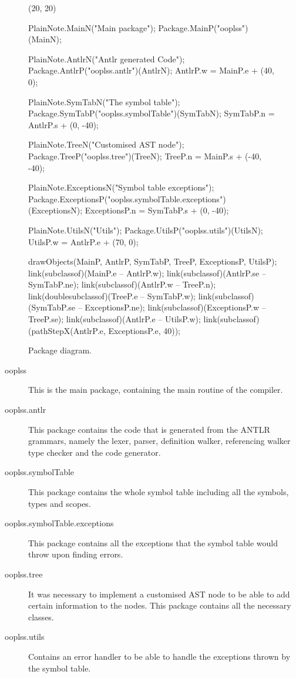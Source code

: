 \begin{figure}[H]
	\centering
	\begin{emp}[classdiag](20, 20)

	PlainNote.MainN("Main package");
	Package.MainP("ooplss")(MainN);

	PlainNote.AntlrN("Antlr generated Code");
	Package.AntlrP("ooplss.antlr")(AntlrN);
	AntlrP.w = MainP.e + (40, 0);

	PlainNote.SymTabN("The symbol table");
	Package.SymTabP("ooplss.symbolTable")(SymTabN);
	SymTabP.n = AntlrP.s + (0, -40);

	PlainNote.TreeN("Customised AST node");
	Package.TreeP("ooplss.tree")(TreeN);
	TreeP.n = MainP.s + (-40, -40);

	PlainNote.ExceptionsN("Symbol table exceptions");
	Package.ExceptionsP("ooplss.symbolTable.exceptions")(ExceptionsN);
	ExceptionsP.n = SymTabP.s + (0, -40);

	PlainNote.UtilsN("Utils");
	Package.UtilsP("ooplss.utils")(UtilsN);
	UtilsP.w = AntlrP.e + (70, 0);

	drawObjects(MainP, AntlrP, SymTabP, TreeP, ExceptionsP, UtilsP);
	link(subclassof)(MainP.e -- AntlrP.w);
	link(subclassof)(AntlrP.se -- SymTabP.ne);
	link(subclassof)(AntlrP.w -- TreeP.n);
	link(doublesubclassof)(TreeP.e -- SymTabP.w);
	link(subclassof)(SymTabP.se -- ExceptionsP.ne);
	link(subclassof)(ExceptionsP.w -- TreeP.se);
	link(subclassof)(AntlrP.e -- UtilsP.w);
	link(subclassof)(pathStepX(AntlrP.e, ExceptionsP.e, 40));

	\end{emp}
	\caption{Package diagram.}
	\label{fig:packages}
\end{figure}


\begin{description}
\item[ooplss] This is the main package, containing the main routine of the
compiler.
\item[ooplss.antlr] This package contains the code that is generated from the
ANTLR grammars, namely the lexer, parser, definition walker, referencing walker
type checker and the code generator.
\item[ooplss.symbolTable] This package contains the whole symbol table including
all the symbols, types and scopes.
\item[ooplss.symbolTable.exceptions] This package contains all the exceptions
that the symbol table would throw upon finding errors.
\item[ooplss.tree] It was necessary to implement a customised AST node to be
able to add certain information to the nodes. This package contains all the
necessary classes.
\item[ooplss.utils] Contains an error handler to be able to handle the
exceptions thrown by the symbol table.
\end{description}

